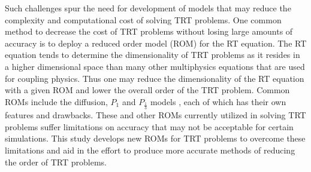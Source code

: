 	\ind Such challenges spur the need for development of models that may reduce the complexity and computational cost of solving TRT problems. One common method to decrease the cost of TRT problems without losing large amounts of accuracy is to deploy a reduced order model (ROM) for the RT equation. The RT equation tends to determine the dimensionality of TRT problems as it resides in a higher dimensional space than many other multiphysics equations that are used for coupling physics. Thus one may reduce the dimensionality of the RT equation with a given ROM and lower the overall order of the TRT problem. Common ROMs include the diffusion, $P_1$ and $P_{\frac{1}{3}}$ models \cite{olson-auer-hall-2000}, each of which has their own features and drawbacks. These and other ROMs currently utilized in solving TRT problems suffer limitations on accuracy that may not be acceptable for certain simulations. This study develops new ROMs for TRT problems to overcome these limitations and aid in the effort to produce more accurate methods of reducing the order of TRT problems.
	
	

